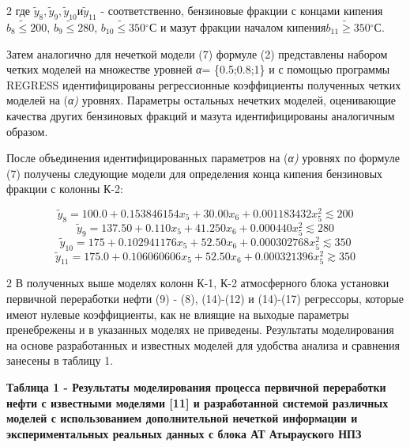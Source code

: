 \begin{multicols}{2}
где \({\widetilde{y}}_{8},{\widetilde{y}}_{9},{\widetilde{y}}_{10}и{\widetilde{y}}_{11}\) - соответственно,
бензиновые фракции с концами кипения \(b_{8}\widetilde{\leq}200\),
\(b_{9}\widetilde{\leq}280\),
\(b_{10}\widetilde{\leq}350\)$^\circ$С и мазут фракции
началом
кипения\(b_{11}\widetilde{\geq}350\)$^\circ$С.

Затем аналогично для нечеткой модели (7) формуле (2) представлены
набором четких моделей на множестве уровней \emph{α}= \{0.5;0.8;1\} и с
помощью программы REGRESS идентифицированы регрессионные коэффициенты
полученных четких моделей на (\emph{α)} уровнях. Параметры остальных
нечетких моделей, оценивающие качества других бензиновых фракций и
мазута идентифицированы аналогичным образом.

После объединения идентифицированных параметров на (\emph{α)} уровнях по
формуле (7) получены следующие модели для определения конца кипения
бензиновых фракции с колонны К-2:
\end{multicols}
\vspace{-1em}
\begin{equation}
{\widetilde{y}}_{8} = 100.0 + 0.153846154x_{5} + 30.00x_{6} + 0.001183432x_{5}^{2} \lesssim 200
\end{equation}
\begin{equation}
{\widetilde{y}}_{9} = 137.50 + 0.110x_{5} + 41.250x_{6} + 0.000440x_{5}^{2} \lesssim 280
\end{equation}
\begin{equation}
{\widetilde{y}}_{10} = 175 + 0.102941176x_{5} + 52.50x_{6} + 0.000302768x_{5}^{2} \lesssim 350
\end{equation}
\begin{equation}
{\widetilde{y}}_{11} = 175.0 + 0.106060606x_{5} + 52.50x_{6} + 0.000321396x_{5}^{2} \gtrsim 350
\end{equation}

\begin{multicols}{2}
В полученных выше моделях колонн К-1, К-2 атмосферного блока установки
первичной переработки нефти (9) - (8), (14)-(12) и (14)-(17) регрессоры,
которые имеют нулевые коэффициенты, как не влиящие на выходые параметры
пренебрежены и в указанных моделях не приведены. Результаты
моделирования на основе разработанных и известных моделей для удобства
анализа и сравнения занесены в таблицу 1.
\end{multicols}

\begin{center}
{\bfseries Таблица 1 - Результаты моделирования процесса первичной
переработки нефти с известными моделями {[}11{]} и разработанной
системой различных моделей с использованием дополнительной нечеткой
информации и экспериментальных реальных данных с блока АТ Атырауского
НПЗ}
\end{center}

